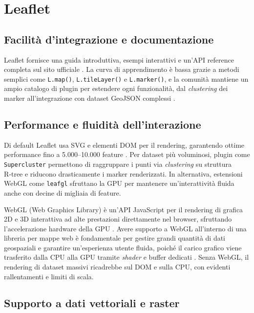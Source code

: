 \section{Leaflet}
\label{ch:leaflet}

\subsection{Facilità d'integrazione e documentazione}
Leaflet fornisce una guida introduttiva, esempi interattivi e un'API reference
completa sul sito ufficiale \cite{leaflet-doc}. La curva di apprendimento è bassa
grazie a metodi semplici come \texttt{L.map()}, \texttt{L.tileLayer()} e \texttt{L.marker()},
e la comunità mantiene un ampio catalogo di plugin per estendere ogni
funzionalità, dal \textit{clustering} dei marker all'integrazione con dataset
GeoJSON complessi \cite{react-leaflet}.

\subsection{Performance e fluidità dell'interazione}
Di default Leaflet usa SVG e elementi DOM per il rendering, garantendo ottime performance
fino a 5.000–10.000 feature \cite{supercluster}. Per dataset più voluminosi, plugin
come \texttt{Supercluster} permettono di raggruppare i punti via \textit{clustering}
su struttura R‑tree e riducono drasticamente i marker renderizzati\cite{supercluster}.
In alternativa, estensioni WebGL come \texttt{leafgl} sfruttano la GPU per mantenere
un'interattività fluida anche con decine di migliaia di feature\cite{leafgl}.

WebGL (Web Graphics Library) è un'API JavaScript per il rendering di grafica 2D
e 3D interattiva ad alte prestazioni direttamente nel browser, sfruttando l'accelerazione
hardware della GPU \cite{wiki-webgl}. Avere supporto a WebGL all'interno di una
libreria per mappe web è fondamentale per gestire grandi quantità di dati
geospaziali e garantire un'esperienza utente fluida, poiché il carico grafico viene
trasferito dalla CPU alla GPU tramite \textit{shader} e buffer dedicati
\cite{khronos-webgl}. Senza WebGL, il rendering di dataset massivi ricadrebbe
sul DOM e sulla CPU, con evidenti rallentamenti e limiti di scala.

\subsection{Supporto a dati vettoriali e raster}

